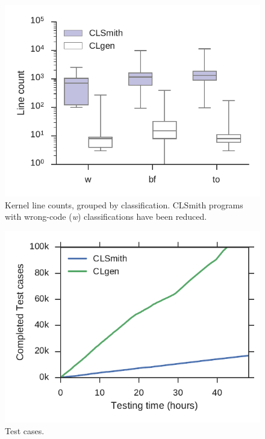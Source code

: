 \begin{figure}
	\centering %
	\includegraphics[width=\columnwidth]{build/img/kernel-sizes}%
	\caption{%
		Kernel line counts, grouped by classification. CLSmith programs with wrong-code (\emph{w}) classifications have been reduced.%
	}%
	\label{fig:kernel-sizes} %
\end{figure}


\begin{figure}
	\centering %
	\includegraphics[width=\columnwidth]{build/img/total-tests}%
	\caption{%
		Test cases.%
	}%
	\label{fig:total-tests} %
\end{figure}